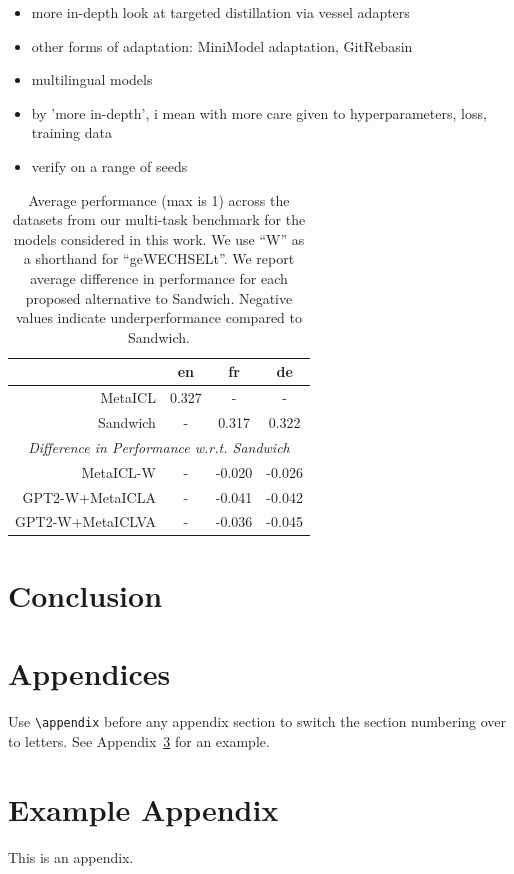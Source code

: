 \documentclass[11pt]{article}
\begin{document}
\begin{itemize}
	\item more in-depth look at targeted distillation via vessel adapters
	\item other forms of adaptation: MiniModel adaptation, GitRebasin
	\item multilingual models
	\item by 'more in-depth', i mean with more care given to hyperparameters, loss, training data
	\item verify on a range of seeds
\end{itemize}

\begin{table}[ht]
	\centering
	\caption{Average performance (max is 1) across the datasets from our multi-task benchmark for the
		models considered in this work. We use ``W'' as a shorthand for ``geWECHSELt''. We report average
		difference in performance for each proposed alternative to Sandwich. Negative values indicate
		underperformance compared to Sandwich.}
	\label{tab:results-summary}
	\begin{tabular}{@{}rccc@{}}
		\toprule
		\multicolumn{1}{c}{} & en    & fr     & de                             \\ \midrule
		MetaICL              & 0.327 & -      & -                              \\
		Sandwich             & -     & 0.317  & 0.322                          \\ \midrule
		\multicolumn{4}{c}{\textit{Difference in Performance w.r.t. Sandwich}} \\
		MetaICL-W            & -     & -0.020 & -0.026                         \\
		GPT2-W+MetaICLA      & -     & -0.041 & -0.042                         \\
		GPT2-W+MetaICLVA     & -     & -0.036 & -0.045                         \\ \bottomrule
	\end{tabular}
\end{table}

\section{Conclusion}



\section{Appendices}

Use \verb|\appendix| before any appendix section to switch the section numbering over to letters.
See Appendix~\ref{sec:appendix} for an example.

\appendix
\section{Example Appendix}
\label{sec:appendix}

This is an appendix.
\end{document}
